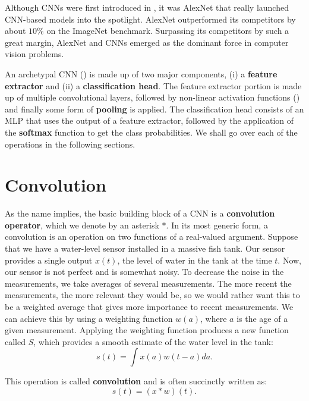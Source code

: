 Although CNNs were first introduced in \citeyear{LeCun1989}, it was AlexNet \parencite{AlexNet2012} that really launched CNN-based models into the spotlight. AlexNet outperformed its competitors by about $10\%$ on the ImageNet \parencite{deng2009imagenet} benchmark. Surpassing its competitors by such a great margin, AlexNet and CNNs emerged as the dominant force in computer vision problems.


An archetypal CNN () is made up of two major components, (i) a \textbf{feature extractor} and (ii) a \textbf{classification head}. The feature extractor portion is made up of multiple convolutional layers, followed by non-linear activation functions () and finally some form of \textbf{pooling} is applied.
The classification head consists of an MLP that uses the output of a feature extractor, followed by the application of the \textbf{softmax} function to get the class probabilities. We shall go over each of the operations in the following sections.


\section{Convolution}\label{sec:convolutions}

As the name implies, the basic building block of a CNN is a \textbf{convolution operator}, which we denote by an asterisk $\ast$. In its most generic form, a convolution is an operation on two functions of a real-valued argument. Suppose that we have a water-level sensor installed in a massive fish tank. Our sensor provides a single output $x(t)$, the level of water in the tank at the time $t$. Now, our sensor is not perfect and is somewhat noisy. 
To decrease the noise in the measurements, we take averages of several measurements. The more recent the measurements, the more relevant they would be, so we would rather want this to be a weighted average that gives more importance to recent measurements.
We can achieve this by using a weighting function $w(a)$, where $a$ is the age of a given measurement. Applying the weighting function produces a new function called $S$, which provides a smooth estimate of the water level in the tank:
\begin{equation}
    \label{eqn:continous-1d-conv}
    s(t)=\int x(a) w(t-a) d a .
\end{equation}

This operation is called \textbf{convolution} and  is often succinctly written as:
\begin{equation}
    \label{eqn:conv-1d-succinct}
    s(t) = (x \ast w)(t).
\end{equation}

